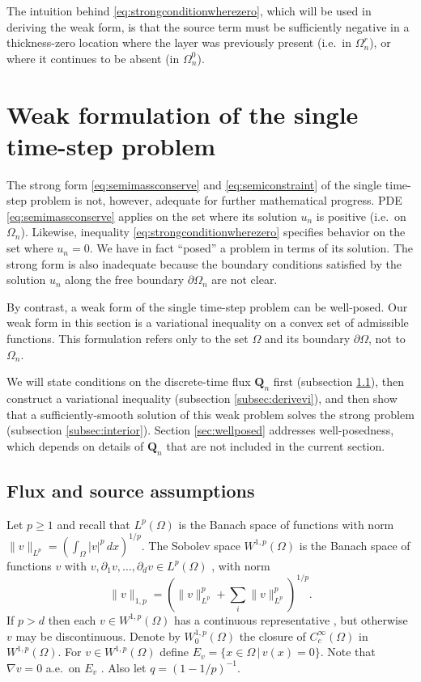 \documentclass[final,leqno,onefignum,onetabnum]{siamltex1213bueler}
\newcommand\bQ{\mathbf{Q}}
\renewcommand{\grad}{\nabla}
\begin{document}
The intuition behind \eqref{eq:strongconditionwherezero}, which will be used in deriving the weak form, is that the source term must be sufficiently negative in a thickness-zero location where the layer was previously present (i.e.~in $\Omega_n^r$), or where it continues to be absent (in $\Omega_n^0$).


\section{Weak formulation of the single time-step problem}  \label{sec:weakform}

The strong form \eqref{eq:semimassconserve} and \eqref{eq:semiconstraint} of the single time-step problem is not, however, adequate for further mathematical progress.  PDE \eqref{eq:semimassconserve} applies on the set where its solution $u_n$ is positive (i.e.~on $\Omega_n$).  Likewise, inequality \eqref{eq:strongconditionwherezero} specifies behavior on the set where $u_n=0$.  We have in fact ``posed'' a problem in terms of its solution.  The strong form is also inadequate because the boundary conditions satisfied by the solution $u_n$ along the free boundary $\partial\Omega_n$ are not clear.

By contrast, a weak form of the single time-step problem can be well-posed.  Our weak form in this section is a variational inequality \cite{Friedman1982,KinderlehrerStampacchia1980} on a convex set of admissible functions.  This formulation refers only to the set $\Omega$ and its boundary $\partial\Omega$, not to $\Omega_n$.

We will state conditions on the discrete-time flux $\bQ_n$ first (subsection \ref{subsec:fluxassumptions}), then construct a variational inequality (subsection \ref{subsec:derivevi}), and then show that a sufficiently-smooth solution of this weak problem solves the strong problem (subsection \ref{subsec:interior}).  Section \ref{sec:wellposed} addresses well-posedness, which depends on details of $\bQ_n$ that are not included in the current section.

\subsection{Flux and source assumptions} \label{subsec:fluxassumptions}  Let $p\ge 1$ and recall that $L^p (\Omega)$ is the Banach space of functions with norm $\|v\|_{L^p} = \left(\int_\Omega |v|^p\,dx\right)^{1/p}$.  The Sobolev space $W^{1,p}(\Omega)$ is the Banach space of functions $v$ with $v,\partial_1 v,\dots,\partial_d v \in L^p(\Omega)$ \cite{Evans1998}, with norm
\begin{equation}
  \|v\|_{1,p} = \left(\|v\|_{L^p}^p + \sum_i \|v\|_{L^p}^p\right)^{1/p}.  \label{eq:norm}
\end{equation}
If $p>d$ then each $v\in W^{1,p}(\Omega)$ has a continuous representative \cite[``Morrey's inequality'']{Evans1998}, but otherwise $v$ may be discontinuous.  Denote by $W_0^{1,p}(\Omega)$ the closure of $C_c^\infty(\Omega)$ in $W^{1,p}(\Omega)$.  For $v \in W^{1,p}(\Omega)$ define $E_v = \{x\in\Omega \,\big|\, v(x) = 0\}$.  Note that $\grad v = 0$ a.e.~on $E_v$ \cite[lemma A.4 in chapter II]{KinderlehrerStampacchia1980}.  Also let $q=(1-1/p)^{-1}$.
\end{document}
